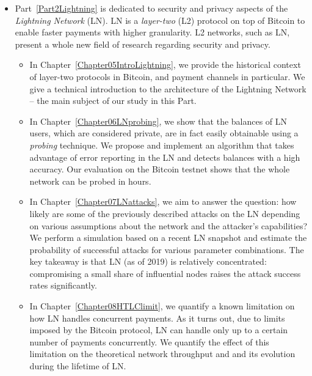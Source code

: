 \begin{itemize}
	\item
	Part~\ref{Part2Lightning} is dedicated to security and privacy aspects of the \textit{Lightning Network} (LN).
	LN is a \textit{layer-two} (L2) protocol on top of Bitcoin to enable faster payments with higher granularity.
	L2 networks, such as LN, present a whole new field of research regarding security and privacy.
	\begin{itemize}
		\item 
	In Chapter~\ref{Chapter05IntroLightning}, we provide the historical context of layer-two protocols in Bitcoin, and payment channels in particular.
	We give a technical introduction to the architecture of the Lightning Network -- the main subject of our study in this Part.
		\item
	In Chapter~\ref{Chapter06LNprobing}, we show that the balances of LN users, which are considered private, are in fact easily obtainable using a \textit{probing} technique.
	We propose and implement an algorithm that takes advantage of error reporting in the LN and detects balances with a high accuracy.
	Our evaluation on the Bitcoin testnet shows that the whole network can be probed in hours.
		\item
	In Chapter~\ref{Chapter07LNattacks}, we aim to answer the question: how likely are some of the previously described attacks on the LN depending on various assumptions about the network and the attacker's capabilities?
	We perform a simulation based on a recent LN snapshot and estimate the probability of successful attacks for various parameter combinations.
	The key takeaway is that LN (as of 2019) is relatively concentrated: compromising a small share of influential nodes raises the attack success rates significantly.
		\item
	In Chapter~\ref{Chapter08HTLClimit}, we quantify a known limitation on how LN handles concurrent payments.
	As it turns out, due to limits imposed by the Bitcoin protocol, LN can handle only up to a certain number of payments concurrently.
	We quantify the effect of this limitation on the theoretical network throughput and and its evolution during the lifetime of LN.
	\end{itemize}


\end{itemize}
